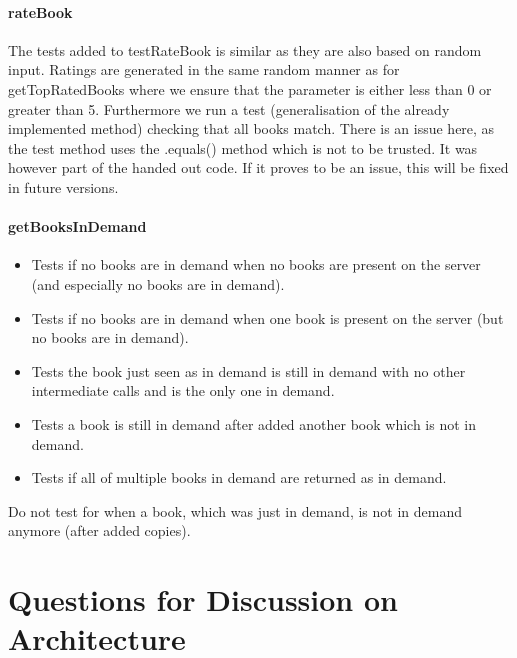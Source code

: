 \documentclass[a4paper, 11pt]{article}
\begin{document}
\paragraph{rateBook}
The tests added to testRateBook is similar as they are also based on random input. Ratings are generated in the same random manner as for getTopRatedBooks where we ensure that the parameter is either less than 0 or greater than 5. Furthermore we run a test (generalisation of the already implemented method) checking that all books match. There is an issue here, as the test method uses the .equals() method which is not to be trusted. It was however part of the handed out code. If it proves to be an issue, this will be fixed in future versions.

\paragraph{getBooksInDemand}
\begin{itemize}
    \item Tests if no books are in demand when no books are present on the server (and especially no books are in demand).
    \item Tests if no books are in demand when one book is present on the server (but no books are in demand).
    \item Tests the book just seen as in demand is still in demand with no other intermediate calls and is the only one in demand.
    \item Tests a book is still in demand after added another book which is not in demand.
    \item Tests if all of multiple books in demand are returned as in demand.
\end{itemize}
Do not test for when a book, which was just in demand, is not in demand anymore (after added copies).


\section{Questions for Discussion on Architecture} %
\label{sec:questions_for_discussion_on_architecture}
\end{document}
